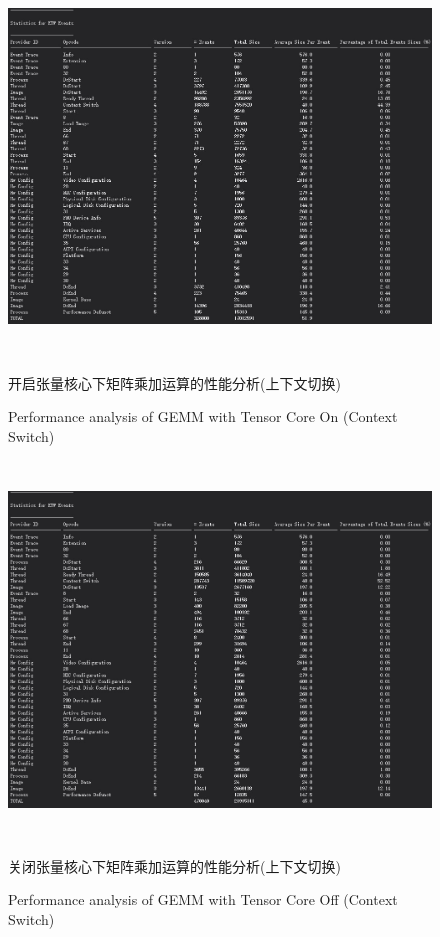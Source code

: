 \begin{figure}
	\centering
	\includegraphics[width=15cm,height=10cm]{figures/GEMMSIGHTTF.jpg}
	\renewcommand{\thefigure}{\arabic{section}-\arabic{figure} }
	\renewcommand{\figurename}{图}
	\caption{开启张量核心下矩阵乘加运算的性能分析(上下文切换)}
	\addtocounter{figure}{-1}
	\renewcommand{\thefigure}{\arabic{section}-\arabic{figure} }
	\renewcommand{\figurename}{Figure}
	\caption{Performance analysis of GEMM with Tensor Core On (Context Switch)}
	\label{Fig.GEMMSIGHTTF}
\end{figure}
\begin{figure}
	\centering
	\includegraphics[width=15cm,height=10cm]{figures/GEMMSIGHTNOTF.jpg}
	\renewcommand{\thefigure}{\arabic{section}-\arabic{figure} }
	\renewcommand{\figurename}{图}
	\caption{关闭张量核心下矩阵乘加运算的性能分析(上下文切换)}
	\addtocounter{figure}{-1}
	\renewcommand{\thefigure}{\arabic{section}-\arabic{figure} }
	\renewcommand{\figurename}{Figure}
	\caption{Performance analysis of GEMM with Tensor Core Off (Context Switch)}
	\label{Fig.GEMMSIGHTNOTF}
\end{figure}
